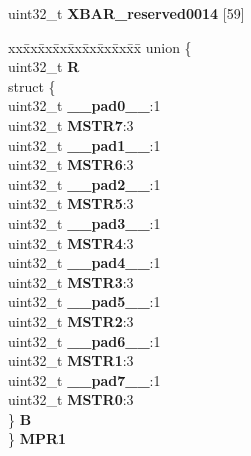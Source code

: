 \begin{DoxyCompactItemize}
\begin{tabbing}
\end{tabbing}\item 
\mbox{\label{structXBAR__tag_a0f29b71474fcc31735e41660ea53ce75}} 
uint32\+\_\+t {\bfseries X\+B\+A\+R\+\_\+reserved0014} \mbox{[}59\mbox{]}
\item 
\mbox{\label{structXBAR__tag_abcb2916d897820ac28f80791b44ae3b4}} 
\begin{tabbing}
xx\=xx\=xx\=xx\=xx\=xx\=xx\=xx\=xx\=\kill
union \{\\
\>uint32\_t {\bfseries R}\\
\>struct \{\\
\>\>uint32\_t {\bfseries \_\_pad0\_\_}:1\\
\>\>uint32\_t {\bfseries MSTR7}:3\\
\>\>uint32\_t {\bfseries \_\_pad1\_\_}:1\\
\>\>uint32\_t {\bfseries MSTR6}:3\\
\>\>uint32\_t {\bfseries \_\_pad2\_\_}:1\\
\>\>uint32\_t {\bfseries MSTR5}:3\\
\>\>uint32\_t {\bfseries \_\_pad3\_\_}:1\\
\>\>uint32\_t {\bfseries MSTR4}:3\\
\>\>uint32\_t {\bfseries \_\_pad4\_\_}:1\\
\>\>uint32\_t {\bfseries MSTR3}:3\\
\>\>uint32\_t {\bfseries \_\_pad5\_\_}:1\\
\>\>uint32\_t {\bfseries MSTR2}:3\\
\>\>uint32\_t {\bfseries \_\_pad6\_\_}:1\\
\>\>uint32\_t {\bfseries MSTR1}:3\\
\>\>uint32\_t {\bfseries \_\_pad7\_\_}:1\\
\>\>uint32\_t {\bfseries MSTR0}:3\\
\>\} {\bfseries B}\\
\} {\bfseries MPR1}\\


\end{tabbing}
\end{DoxyCompactItemize}
